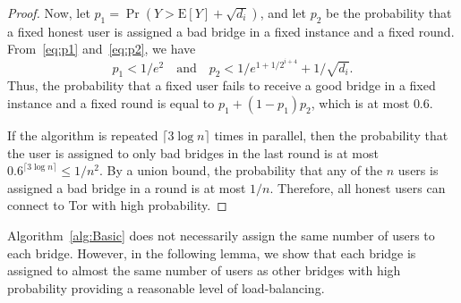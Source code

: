 \documentclass[USenglish,oneside,twocolumn]{article}
\newcommand{\E}{\mathbf{\mathrm{E}}}
\begin{document}
\begin{proof}
	Now, let ${p_1 = \Pr(Y > \E[Y] + \sqrt{d_i})}$, and let $p_2$ be the probability that a fixed honest user is assigned a bad bridge in a fixed instance and a fixed round. From~\eqref{eq:p1} and~\eqref{eq:p2}, we have
	\[p_1 < 1/e^2 \quad \text{and} \quad p_2 < 1/e^{1+1/2^{i+4}} + 1/\sqrt{d_i}.\]
	Thus, the probability that a fixed user fails to receive a good bridge in a fixed instance and a fixed round is equal to ${p_1 + (1-p_1)p_2}$, which is at most $0.6$.
	
	If the algorithm is repeated ${\lceil 3\log{n} \rceil}$ times in parallel, then the probability that the user is assigned to only bad bridges in the last round is at most ${0.6^{\lceil 3\log{n} \rceil} \leq 1/n^2}$.
	By a union bound, the probability that any of the $n$ users is assigned a bad bridge in a round is at most $1/n$. 
	Therefore, all honest users can connect to Tor with high probability.
\end{proof}


Algorithm~\ref{alg:Basic} does not necessarily assign the same number of users to each bridge. However, in the following lemma, we show that each bridge is assigned to almost the same number of users as other bridges with high probability providing a reasonable level of load-balancing.
\end{document}
